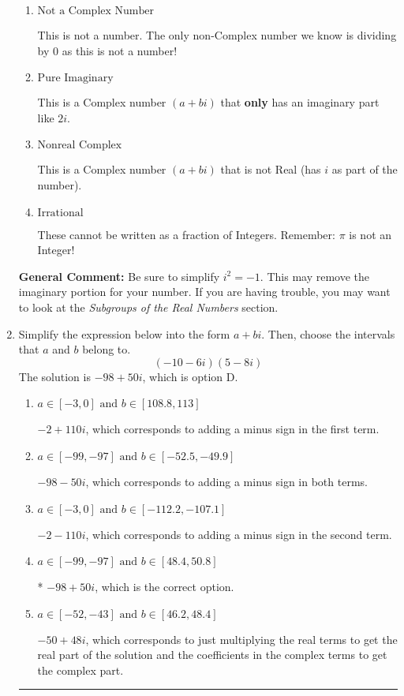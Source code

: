 \documentclass{extbook}[14pt]
\newcommand{\litem}[1]{\item #1

\rule{\textwidth}{0.4pt}}
\begin{document}
\begin{enumerate}
{\begin{enumerate}[label=\Alph*.]
* This is the correct option!
\item \( \text{Not a Complex Number} \)

This is not a number. The only non-Complex number we know is dividing by 0 as this is not a number!
\item \( \text{Pure Imaginary} \)

This is a Complex number $(a+bi)$ that \textbf{only} has an imaginary part like $2i$.
\item \( \text{Nonreal Complex} \)

This is a Complex number $(a+bi)$ that is not Real (has $i$ as part of the number).
\item \( \text{Irrational} \)

These cannot be written as a fraction of Integers. Remember: $\pi$ is not an Integer!
\end{enumerate}

\textbf{General Comment:} Be sure to simplify $i^2 = -1$. This may remove the imaginary portion for your number. If you are having trouble, you may want to look at the \textit{Subgroups of the Real Numbers} section.
}
\litem{
Simplify the expression below into the form $a+bi$. Then, choose the intervals that $a$ and $b$ belong to.
\[ (-10 - 6 i)(5 - 8 i) \]The solution is \( -98 + 50 i \), which is option D.\begin{enumerate}[label=\Alph*.]
\item \( a \in [-3, 0] \text{ and } b \in [108.8, 113] \)

 $-2 + 110 i$, which corresponds to adding a minus sign in the first term.
\item \( a \in [-99, -97] \text{ and } b \in [-52.5, -49.9] \)

 $-98 - 50 i$, which corresponds to adding a minus sign in both terms.
\item \( a \in [-3, 0] \text{ and } b \in [-112.2, -107.1] \)

 $-2 - 110 i$, which corresponds to adding a minus sign in the second term.
\item \( a \in [-99, -97] \text{ and } b \in [48.4, 50.8] \)

* $-98 + 50 i$, which is the correct option.
\item \( a \in [-52, -43] \text{ and } b \in [46.2, 48.4] \)

 $-50 + 48 i$, which corresponds to just multiplying the real terms to get the real part of the solution and the coefficients in the complex terms to get the complex part.
\end{enumerate}

}
\end{enumerate}
\end{document}
